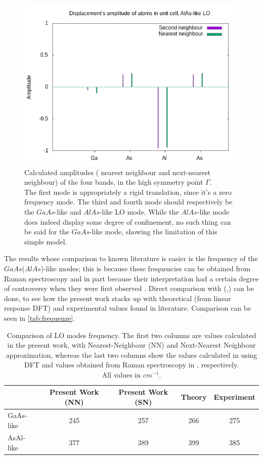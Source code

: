\documentclass{article}
\begin{document}
\begin{figure}[hp]
	\includegraphics[scale=0.35]{ampiezze4.jpg}
	\caption{Calculated amplitudes ({\color{pinegreen} nearest neighbour} and {\color{plum} next-nearest neighbour})  of the four bands, in the high symmetry point $\Gamma$.\\ The first mode is appropriately a rigid translation, since it's a zero frequency mode. The third and fourth mode should respectively be the $GaAs$-like and $AlAs$-like LO mode. While the $AlAs$-like mode does indeed display some degree of confinement, no such thing can be said for the $GaAs$-like mode, showing the limitation of this simple model.}
	\label{fig:ampiezze}
\end{figure}
The results whose comparison to known literature is easier is the frequency of the $GaAs$($AlAs$)-like modes; this is because these frequencies can be obtained from Raman spectroscopy and in part because their interpretation had a certain degree of controversy when they were first observed \cite{Molinari}. Direct comparison with (\cite[Fig.6]{Molinari},\cite{Cardona,Ishibashi}) can be done, to see how the present work stacks up with theoretical (from linear response DFT)  and experimental values found in literature. Comparison can be seen in \autoref{tab:frequenze}.\\
\medskip

\begin{table}
	\begin{tabular}{||l|c|c|c|c||}
		\hline
		& Present Work (NN) & Present Work (SN)& Theory \cite{Molinari} & Experiment \cite{Cardona,Ishibashi} \\
			\hline
		GaAs-like & 245 &257 &266&275 \\
		\hline
		AsAl-like & 377 & 389&399&385 \\
		\hline
	\end{tabular}
	\caption{Comparison of LO modes frequency. The first two columns are values calculated in the present work, with Nearest-Neighbour (NN) and Next-Nearest Neighbour approximation, whereas the last two columns show the values calculated in \cite{Molinari} using DFT and values obtained from Raman spectroscopy in \cite{Cardona, Ishibashi}, respectively.\\
	All values in $cm^{-1}$.}
	\label{tab:frequenze}
\end{table}
\end{document}
